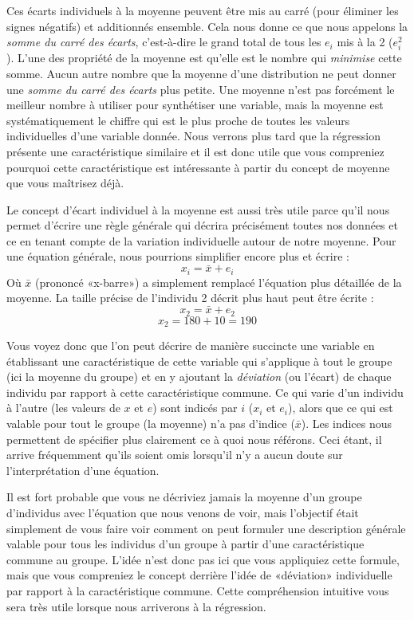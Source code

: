\documentclass[
]{book}
\begin{document}
Ces écarts individuels à la moyenne peuvent être mis au carré (pour éliminer les signes négatifs) et additionnés ensemble. Cela nous donne ce que nous appelons la \emph{somme du carré des écarts}, c'est-à-dire le grand total de tous les \(e_i\) mis à la 2 (\(e_i^2\)). L'une des propriété de la moyenne est qu'elle est le nombre qui \emph{minimise} cette somme. Aucun autre nombre que la moyenne d'une distribution ne peut donner une \emph{somme du carré des écarts} plus petite. Une moyenne n'est pas forcément le meilleur nombre à utiliser pour synthétiser une variable, mais la moyenne est systématiquement le chiffre qui est le plus proche de toutes les valeurs individuelles d'une variable donnée. Nous verrons plus tard que la régression présente une caractéristique similaire et il est donc utile que vous compreniez pourquoi cette caractéristique est intéressante à partir du concept de moyenne que vous maîtrisez déjà.

Le concept d'écart individuel à la moyenne est aussi très utile parce qu'il nous permet d'écrire une règle générale qui décrira précisément toutes nos données et ce en tenant compte de la variation individuelle autour de notre moyenne. Pour une équation générale, nous pourrions simplifier encore plus et écrire :
\[x_i= \bar{x} + e_i\]
Où \(\bar{x}\) (prononcé «x-barre») a simplement remplacé l'équation plus détaillée de la moyenne. La taille précise de l'individu 2 décrit plus haut peut être écrite :
\[x_2= \bar{x} + e_2\]
\[x_2 = 180 + 10 = 190\]

Vous voyez donc que l'on peut décrire de manière succincte une variable en établissant une caractéristique de cette variable qui s'applique à tout le groupe (ici la moyenne du groupe) et en y ajoutant la \emph{déviation} (ou l'écart) de chaque individu par rapport à cette caractéristique commune. Ce qui varie d'un individu à l'autre (les valeurs de \(x\) et \(e\)) sont indicés par \(i\) (\(x_i\) et \(e_i\)), alors que ce qui est valable pour tout le groupe (la moyenne) n'a pas d'indice (\(\bar{x}\)). Les indices nous permettent de spécifier plus clairement ce à quoi nous référons. Ceci étant, il arrive fréquemment qu'ils soient omis lorsqu'il n'y a aucun doute sur l'interprétation d'une équation.

Il est fort probable que vous ne décriviez jamais la moyenne d'un groupe d'individus avec l'équation que nous venons de voir, mais l'objectif était simplement de vous faire voir comment on peut formuler une description générale valable pour tous les individus d'un groupe à partir d'une caractéristique commune au groupe. L'idée n'est donc pas ici que vous appliquiez cette formule, mais que vous compreniez le concept derrière l'idée de «déviation» individuelle par rapport à la caractéristique commune. Cette compréhension intuitive vous sera très utile lorsque nous arriverons à la régression.
\end{document}
